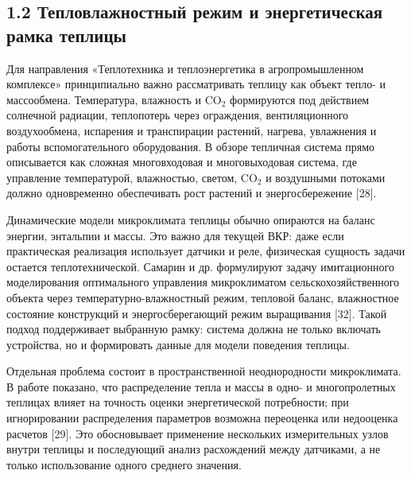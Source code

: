 \documentclass[a4paper,14pt]{extarticle}
\begin{document}
\hypertarget{ux442ux435ux43fux43bux43eux432ux43bux430ux436ux43dux43eux441ux442ux43dux44bux439-ux440ux435ux436ux438ux43c-ux438-ux44dux43dux435ux440ux433ux435ux442ux438ux447ux435ux441ux43aux430ux44f-ux440ux430ux43cux43aux430-ux442ux435ux43fux43bux438ux446ux44b}{%
\subsection{1.2 Тепловлажностный режим и энергетическая рамка
теплицы}\label{ux442ux435ux43fux43bux43eux432ux43bux430ux436ux43dux43eux441ux442ux43dux44bux439-ux440ux435ux436ux438ux43c-ux438-ux44dux43dux435ux440ux433ux435ux442ux438ux447ux435ux441ux43aux430ux44f-ux440ux430ux43cux43aux430-ux442ux435ux43fux43bux438ux446ux44b}}

Для направления «Теплотехника и теплоэнергетика в агропромышленном
комплексе» принципиально важно рассматривать теплицу как объект тепло- и
массообмена. Температура, влажность и CO\(_2\) формируются под действием
солнечной радиации, теплопотерь через ограждения, вентиляционного
воздухообмена, испарения и транспирации растений, нагрева, увлажнения и
работы вспомогательного оборудования. В обзоре тепличная система прямо
описывается как сложная многовходовая и многовыходовая система, где
управление температурой, влажностью, светом, CO\(_2\) и воздушными
потоками должно одновременно обеспечивать рост растений и
энергосбережение {[}28{]}.

Динамические модели микроклимата теплицы обычно опираются на баланс
энергии, энтальпии и массы. Это важно для текущей ВКР: даже если
практическая реализация использует датчики и реле, физическая сущность
задачи остается теплотехнической. Самарин и др. формулируют задачу
имитационного моделирования оптимального управления микроклиматом
сельскохозяйственного объекта через температурно-влажностный режим,
тепловой баланс, влажностное состояние конструкций и энергосберегающий
режим выращивания {[}32{]}. Такой подход поддерживает выбранную рамку:
система должна не только включать устройства, но и формировать данные
для модели поведения теплицы.

Отдельная проблема состоит в пространственной неоднородности
микроклимата. В работе показано, что распределение тепла и массы в одно-
и многопролетных теплицах влияет на точность оценки энергетической
потребности; при игнорировании распределения параметров возможна
переоценка или недооценка расчетов {[}29{]}. Это обосновывает применение
нескольких измерительных узлов внутри теплицы и последующий анализ
расхождений между датчиками, а не только использование одного среднего
значения.
\end{document}
